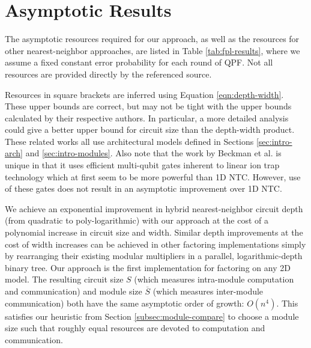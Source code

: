 \section{Asymptotic Results}
\label{sec:fpl-results}

The asymptotic resources required for our approach,
as well as the resources for other nearest-neighbor approaches,
are listed in Table \ref{tab:fpl-results},
where we assume a fixed constant error
probability for each round of QPF. Not all resources are
provided directly by the referenced source.

Resources in square brackets
are inferred using Equation \ref{eqn:depth-width}.
These upper bounds are correct,
but may not be tight with the upper bounds
calculated by their respective authors.
In particular, a more detailed analysis
could give a better upper bound for circuit size than the
depth-width product.
These related works all use architectural models defined in
Sections \ref{sec:intro-arch} and \ref{sec:intro-modules}.
 Also note that the
work by Beckman et al. \cite{Beckman1996} is unique in that it uses
efficient multi-qubit gates inherent to linear ion trap technology which
at first seem to
be more powerful than \textsf{1D NTC}. However, use of these gates does not
result in an asymptotic improvement over \textsf{1D NTC}.

We achieve an exponential
improvement in hybrid nearest-neighbor circuit depth (from quadratic to poly-logarithmic)
with our approach at the cost of a polynomial increase in
circuit size and width.
Similar depth improvements at the cost of width increases can be achieved
in other factoring implementations simply by rearranging their
existing modular multipliers in a parallel, logarithmic-depth binary tree.
Our approach is the first implementation for factoring on any
\textsc{2D} model. The resulting circuit size $S$ (which measures
intra-module computation and communication) and module size $\overline{S}$
(which measures inter-module communication)
both have the same asymptotic order of growth: $O(n^4)$. This satisfies
our heuristic from Section \ref{subsec:module-compare} to choose
a module size such that roughly equal resources are devoted to
computation and communication.

